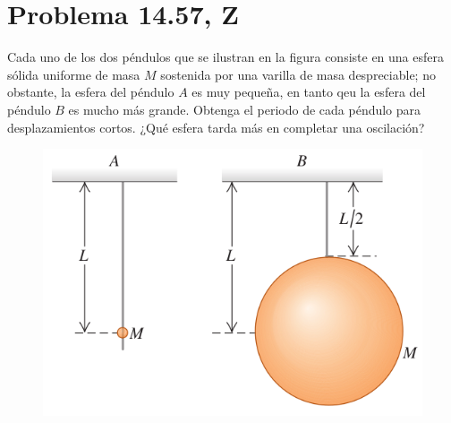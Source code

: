 \section*{Problema 14.57, Z}

\noindent Cada uno de los dos péndulos que se ilustran en la figura consiste en una esfera sólida uniforme de masa $M$ sostenida por una varilla de masa despreciable; no obstante, la esfera del péndulo $A$ es muy pequeña, en tanto qeu la esfera del péndulo $B$ es mucho más grande. Obtenga el periodo de cada péndulo para desplazamientos cortos. ¿Qué esfera tarda más en completar una oscilación?



\begin{figure}[H]
	\centering
	\includegraphics[scale=0.4]{./img/t8.png}
\end{figure}







